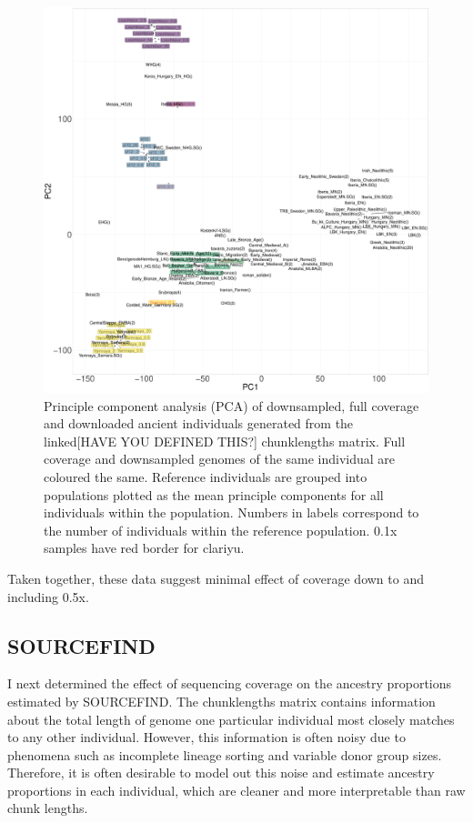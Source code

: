 \begin{figure}[htp]
    \centering
    \includegraphics[width=1.0\textwidth]{../images/chapter1/PCA_panel_allInds.allCoverage.pdf}
    \caption{Principle component analysis (PCA) of downsampled, full coverage and downloaded ancient individuals generated from the linked{\color{red}[HAVE YOU DEFINED THIS?]} chunklengths matrix. Full coverage and downsampled genomes of the same individual are coloured the same. Reference individuals are grouped into populations plotted as the mean principle components for all individuals within the population. Numbers in labels correspond to the number of individuals within the reference population. 0.1x samples have red border for clariyu.}
    \label{fig:PCA_panel_allInds_allCoverage}
\end{figure}

Taken together, these data suggest minimal effect of coverage down to and including 0.5x.

\subsection{SOURCEFIND}

I next determined the effect of sequencing coverage on the ancestry proportions estimated by SOURCEFIND. The chunklengths matrix contains information about the total length of genome one particular individual most closely matches to any other individual. However, this information is often noisy due to phenomena such as incomplete lineage sorting and variable donor group sizes. Therefore, it is often desirable to model out this noise and estimate ancestry proportions in each individual, which are cleaner and more interpretable than raw chunk lengths. 

